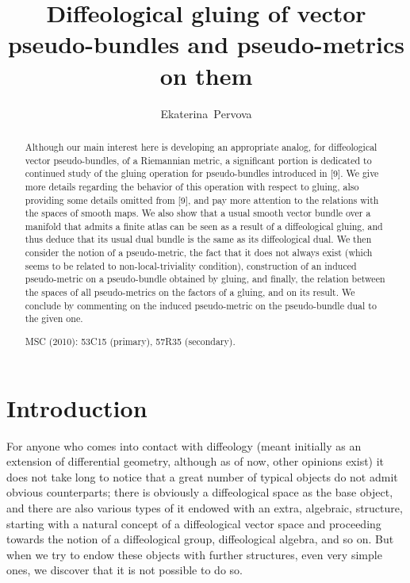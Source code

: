 \documentclass{article}
\begin{document}
\title{Diffeological gluing of vector pseudo-bundles and pseudo-metrics on them}

\author{Ekaterina~{\textsc Pervova}}

\maketitle

\begin{abstract}
\noindent Although our main interest here is developing an appropriate analog, for diffeological vector pseudo-bundles, of a Riemannian metric, a significant portion is dedicated to continued study of the 
gluing operation for pseudo-bundles introduced in [9]. We give more details regarding the behavior of this operation with respect to gluing, also providing some details omitted from [9], and pay more attention 
to the relations with the spaces of smooth maps. We also show that a usual smooth vector bundle over a manifold that admits a finite atlas can be seen as a result of a diffeological gluing, and thus deduce 
that its usual dual bundle is the same as its diffeological dual. We then consider the notion of a pseudo-metric, the fact that it does not always exist (which seems to be related to non-local-triviality condition), 
construction of an induced pseudo-metric on a pseudo-bundle obtained by gluing, and finally, the relation between the spaces of all pseudo-metrics on the factors of a gluing, and on its result. We conclude by
commenting on the induced pseudo-metric on the pseudo-bundle dual to the given one.

\noindent MSC (2010): 53C15 (primary), 57R35 (secondary).
\end{abstract}


\section*{Introduction}

For anyone who comes into contact with diffeology \cite{iglesiasBook} (meant initially as an extension of differential geometry, although as of now, other opinions exist) it does not take long to notice that 
a great number of typical objects do not admit obvious counterparts; there is obviously a diffeological space as the base object, and there are also various types of it endowed with an extra, algebraic, 
structure, starting with a natural concept of a diffeological vector space and proceeding towards the notion of a diffeological group, diffeological algebra, and so on. But when we try to endow these objects 
with further structures, even very simple ones, we discover that it is not possible to do so.
\end{document}
